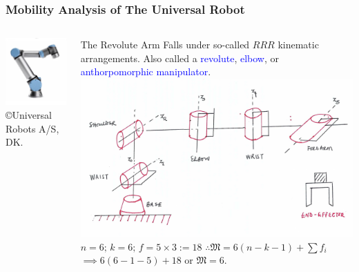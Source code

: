 \begin{frame}
	\frametitle{Mobility Analysis of The Universal Robot}
	\begin{columns}[]
		\begin{column}{.5\linewidth}
			\centering
			\includegraphics[width=\textwidth]{figures/ur16.jpg}
			\footnotesize{\copyright Universal Robots A/S, DK.}
		\end{column}
		\begin{column}{.5\linewidth}
			\centering
			\begin{block}{The Revolute Arm}
				\footnotesize{Falls under so-called $RRR$ kinematic arrangements. Also called a \textcolor{blue}{revolute}, \textcolor{blue}{elbow}, or \textcolor{blue}{anthorpomorphic manipulator}.}
			\includegraphics[width=\textwidth]{figures/ur_scheme.jpg}
			$n=6; \, k=6; \, f=5\times3:=18$ $\therefore \mathfrak{M}=6(n-k-1)+\sum f_i $ $\implies 6(6-1-5) + 18$ or $\mathfrak{M}=6$.
			\end{block}
		\end{column}
	\end{columns}
\end{frame}


